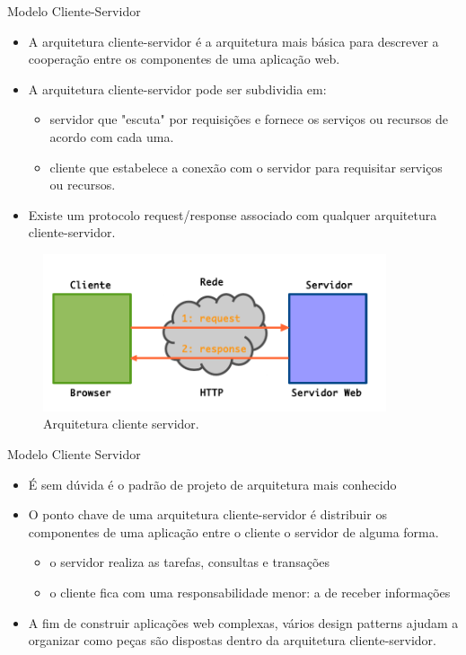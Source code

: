 \begin{frame}{Modelo Cliente-Servidor}
	\begin{itemize}
		\item A arquitetura \alert{cliente-servidor} é a arquitetura mais básica para descrever a cooperação
		entre os componentes de uma aplicação web.
		\item A arquitetura cliente-servidor pode ser subdividia em:
		\begin{itemize}
			\item \alert{servidor} que "escuta" por requisições e fornece os serviços ou recursos de acordo com 
			cada  uma.
			\item \alert{cliente} que estabelece a conexão com o servidor para requisitar serviços ou recursos.
		\end{itemize}
		\item Existe um protocolo \alert{request/response} associado com qualquer arquitetura cliente-servidor.
	\end{itemize}
	\begin{figure}[h!]
		\centering
		\includegraphics[width=0.90\textwidth]{imagens/cliente-servidor-1.png}
		\caption{Arquitetura cliente servidor.}
	\end{figure} 
	
\end{frame}
\begin{frame}{Modelo Cliente Servidor}
  \begin{itemize}
    \item É sem dúvida é o padrão de projeto de arquitetura mais conhecido
    \item O ponto chave de uma arquitetura cliente-servidor é \alert{distribuir} os componentes de uma 
      aplicação entre o cliente o servidor de alguma forma. 
    \begin{itemize}
        \item o servidor realiza as tarefas, consultas e transações
        \item o cliente fica com uma responsabilidade menor: a de receber informações
    \end{itemize} 
    \item A fim de construir aplicações web complexas, vários design patterns ajudam a \alert{organizar} como peças 
      são dispostas dentro da arquitetura cliente-servidor.
  \end{itemize}
\end{frame}

